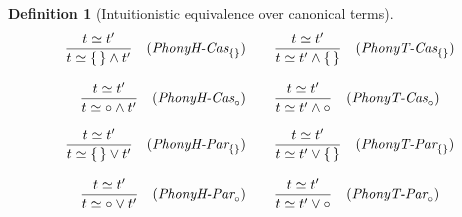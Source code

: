 \documentclass[12pt]{article}
\newtheorem{Definition}{Definition}[section]
\begin{document}
\begin{Definition}[Intuitionistic equivalence over canonical terms]
\begin{displaymath}
\begin{array}{c}
      \begin{array}{ll}
        \begin{array}{rl}
          \dfrac{ t \simeq t' }{
            t \simeq \{\,\} \wedge t'
          }  &  (\text{\it PhonyH-Cas}_{\{\}})
        \end{array}
        & \begin{array}{rl}
            \dfrac{ t \simeq t' }{
              t \simeq t' \wedge \{\,\}
            }  &  (\text{\it PhonyT-Cas}_{\{\}})
          \end{array}
      \end{array}  \\
      \\
      
      \begin{array}{ll}
        \begin{array}{rl}
          \dfrac{ t \simeq t' }{
            t \simeq \circ \wedge t'
          }  &  (\text{\it PhonyH-Cas}_\circ)
        \end{array}
        & \begin{array}{rl}
            \dfrac{ t \simeq t' }{
              t \simeq t' \wedge \circ
            }  &  (\text{\it PhonyT-Cas}_\circ)
          \end{array}
      \end{array}  \\
      \\
            
      \begin{array}{ll}
        \begin{array}{rl}
          \dfrac{ t \simeq t' }{
            t \simeq \{\,\} \vee t'
          }  &  (\text{\it PhonyH-Par}_{\{\}})
        \end{array}
        & \begin{array}{rl}
            \dfrac{ t \simeq t' }{
              t \simeq t' \vee \{\,\}
            }  &  (\text{\it PhonyT-Par}_{\{\}})
          \end{array}
      \end{array}  \\
      \\

      \begin{array}{ll}
        \begin{array}{rl}
          \dfrac{ t \simeq t' }{
            t \simeq \circ \vee t'
          }  &  (\text{\it PhonyH-Par}_\circ)
        \end{array}
        & \begin{array}{rl}
            \dfrac{ t \simeq t' }{
              t \simeq t' \vee \circ
            }  &  (\text{\it PhonyT-Par}_\circ)
          \end{array}
      \end{array}  \\
      \\
      

\end{array}
\end{displaymath}
\end{Definition}
\end{document}
